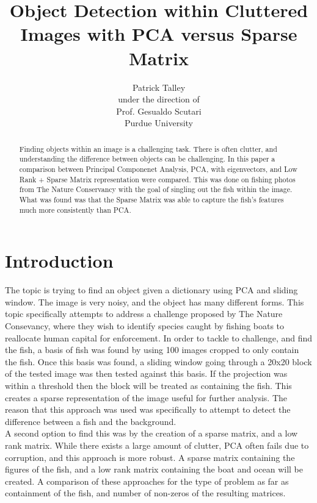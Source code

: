 \documentclass[11pt]{article} %
\title{Object Detection within Cluttered Images with PCA versus Sparse Matrix}
\author{Patrick Talley
  \vspace{0.5in} \\
  under the direction of \\
  Prof. Gesualdo Scutari \\
  Purdue University \\
  \vspace{1in}}
\date{} %
\begin{document}
\maketitle
\begin{abstract}
Finding objects within an image is a challenging task. There is often clutter, and understanding the difference between objects can be challenging. In this paper
a comparison between Principal Componenet Analysis, PCA, with eigenvectors, and Low Rank + Sparse Matrix representation were compared. This was done on fishing
photos from The Nature Conservancy with the goal of singling out the fish within the image. What was found was that the Sparse Matrix was able to capture the fish's
features much more consistently than PCA.
\end{abstract}

\pagebreak

\tableofcontents

\pagebreak
\section{Introduction}
The topic is trying to find an object given a dictionary using PCA and sliding window.
The image is very noisy, and the object has many different forms.
This topic specifically attempts to address a challenge proposed by The Nature Consevancy,
where they wish to identify species caught by fishing boats to reallocate human capital for enforcement.
In order to tackle to challenge, and find the fish, a basis of fish was found by using 100 images cropped to only contain the fish.
Once this basis was found, a sliding window going through a 20x20 block of the tested image was then tested against this basis.
If the projection was within a threshold then the block will be treated as containing the fish. This creates a sparse representation of the image useful for further analysis.
The reason that this approach was used was specifically to attempt to detect the difference between a fish and the background.  \\
A second option to find this was by the creation of a sparse matrix, and a low rank matrix. While there exists a large amount of clutter, PCA often
fails due to corruption, and this approach is more robust. A sparse matrix containing the figures of the fish, and a low rank matrix containing the boat and ocean will
be created. A comparison of these approaches for the type of problem as far as containment of the fish, and number of non-zeros of the resulting matrices.
\end{document}
